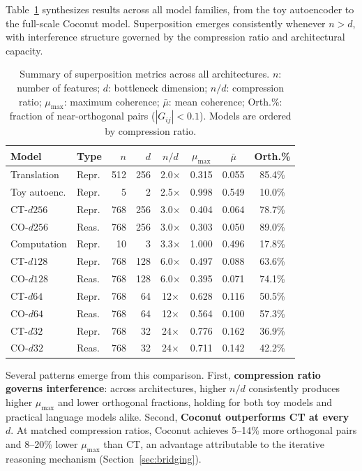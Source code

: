 Table~\ref{tab:full_comparison} synthesizes results across all model families, from the toy autoencoder to the full-scale Coconut model. Superposition emerges consistently whenever $n > d$, with interference structure governed by the compression ratio and architectural capacity.

\begin{table}[t]
\centering
\caption{Summary of superposition metrics across all architectures. $n$: number of features; $d$: bottleneck dimension; $n/d$: compression ratio; $\mu_{\max}$: maximum coherence; $\bar{\mu}$: mean coherence; Orth.\%: fraction of near-orthogonal pairs ($|G_{ij}| < 0.1$). Models are ordered by compression ratio.}
\label{tab:full_comparison}
\small
\begin{tabular}{llrrcccc}
\toprule
\textbf{Model} & \textbf{Type} & $n$ & $d$ & $n/d$ & $\mu_{\max}$ & $\bar{\mu}$ & \textbf{Orth.\%} \\
\midrule
Translation & Repr. & 512 & 256 & 2.0$\times$ & 0.315 & 0.055 & 85.4\% \\
Toy autoenc. & Repr. & 5 & 2 & 2.5$\times$ & 0.998 & 0.549 & 10.0\% \\
CT-$d256$ & Repr. & 768 & 256 & 3.0$\times$ & 0.404 & 0.064 & 78.7\% \\
CO-$d256$ & Reas. & 768 & 256 & 3.0$\times$ & 0.303 & 0.050 & 89.0\% \\
Computation & Repr. & 10 & 3 & 3.3$\times$ & 1.000 & 0.496 & 17.8\% \\
CT-$d128$ & Repr. & 768 & 128 & 6.0$\times$ & 0.497 & 0.088 & 63.6\% \\
CO-$d128$ & Reas. & 768 & 128 & 6.0$\times$ & 0.395 & 0.071 & 74.1\% \\
CT-$d64$ & Repr. & 768 & 64 & 12$\times$ & 0.628 & 0.116 & 50.5\% \\
CO-$d64$ & Reas. & 768 & 64 & 12$\times$ & 0.564 & 0.100 & 57.3\% \\
CT-$d32$ & Repr. & 768 & 32 & 24$\times$ & 0.776 & 0.162 & 36.9\% \\
CO-$d32$ & Reas. & 768 & 32 & 24$\times$ & 0.711 & 0.142 & 42.2\% \\
\bottomrule
\end{tabular}
\end{table}

Several patterns emerge from this comparison. First, \textbf{compression ratio governs interference}: across architectures, higher $n/d$ consistently produces higher $\mu_{\max}$ and lower orthogonal fractions, holding for both toy models and practical language models alike. Second, \textbf{Coconut outperforms CT at every $d$}. At matched compression ratios, Coconut achieves 5--14\% more orthogonal pairs and 8--20\% lower $\mu_{\max}$ than CT, an advantage attributable to the iterative reasoning mechanism (Section~\ref{sec:bridging}).

